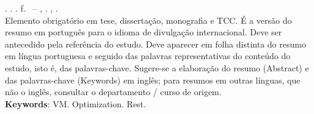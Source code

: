 \begin{resumo}[ABSTRACT]
\begin{SingleSpacing}

\imprimirautorcitacao. \imprimirtitleabstract. \imprimirdata. \pageref {LastPage} f. \imprimirprojeto\ – \imprimirprograma, \imprimirinstituicao. \imprimirlocal, \imprimirdata.\\

Elemento obrigatório em tese, dissertação, monografia e TCC. 
É a versão do resumo em português para o idioma de divulgação internacional. 
Deve ser antecedido pela referência do estudo. Deve aparecer em folha distinta do resumo em língua portuguesa e 
seguido das palavras representativas do conteúdo do estudo, isto é, das palavras-chave. Sugere-se a elaboração do resumo (Abstract) e 
das palavras-chave (Keywords) em inglês; para resumos em outras línguas, que não o inglês, consultar o departamento / curso de origem.\\

\textbf{Keywords}: VM. Optimization. Rest. 

\end{SingleSpacing}
\end{resumo}
